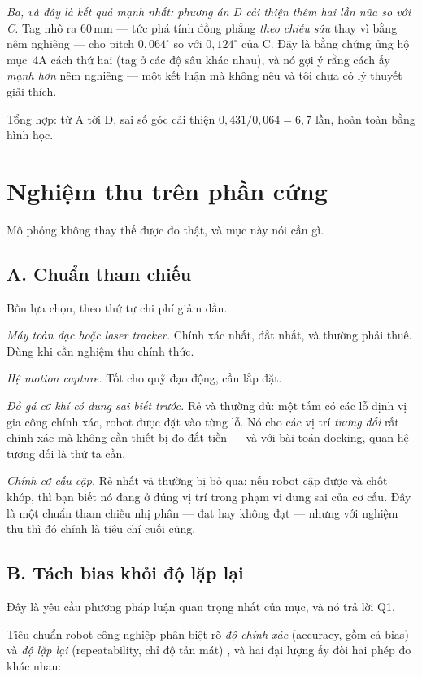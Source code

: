 \documentclass[../../marker.tex]{subfiles}
\begin{document}
\emph{Ba, và đây là kết quả mạnh nhất: phương án D cải thiện thêm hai lần nữa so với C.} Tag nhô ra 60\,mm --- tức phá tính đồng phẳng \emph{theo chiều sâu} thay vì bằng nêm nghiêng --- cho pitch \(0{,}064^\circ\) so với \(0{,}124^\circ\) của C. Đây là bằng chứng ủng hộ  mục~4A cách thứ hai (tag ở các độ sâu khác nhau), và nó gợi ý rằng cách ấy \emph{mạnh hơn} nêm nghiêng --- một kết luận mà  không nêu và tôi chưa có lý thuyết giải thích.

Tổng hợp: từ A tới D, sai số góc cải thiện \(0{,}431/0{,}064 = 6{,}7\) lần, hoàn toàn bằng hình học.

\section{Nghiệm thu trên phần cứng}

Mô phỏng không thay thế được đo thật, và mục này nói cần gì.

\subsection{A. Chuẩn tham chiếu}

Bốn lựa chọn, theo thứ tự chi phí giảm dần.

\emph{Máy toàn đạc hoặc laser tracker.} Chính xác nhất, đắt nhất, và thường phải thuê. Dùng khi cần nghiệm thu chính thức.

\emph{Hệ motion capture.} Tốt cho quỹ đạo động, cần lắp đặt.

\emph{Đồ gá cơ khí có dung sai biết trước.} Rẻ và thường đủ: một tấm có các lỗ định vị gia công chính xác, robot được đặt vào từng lỗ. Nó cho các vị trí \emph{tương đối} rất chính xác mà không cần thiết bị đo đắt tiền --- và với bài toán docking, quan hệ tương đối là thứ ta cần.

\emph{Chính cơ cấu cập.} Rẻ nhất và thường bị bỏ qua: nếu robot cập được và chốt khớp, thì bạn biết nó đang ở đúng vị trí trong phạm vi dung sai của cơ cấu. Đây là một chuẩn tham chiếu nhị phân --- đạt hay không đạt --- nhưng với nghiệm thu thì đó chính là tiêu chí cuối cùng.

\subsection{B. Tách bias khỏi độ lặp lại}

Đây là yêu cầu phương pháp luận quan trọng nhất của mục, và nó trả lời Q1.

Tiêu chuẩn robot công nghiệp phân biệt rõ \emph{độ chính xác} (accuracy, gồm cả bias) và \emph{độ lặp lại} (repeatability, chỉ độ tản mát) \cite{iso9283}, và hai đại lượng ấy đòi hai phép đo khác nhau:
\end{document}

